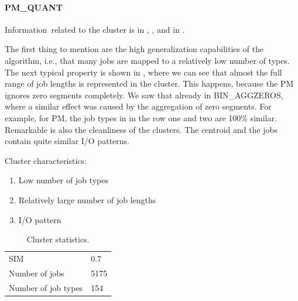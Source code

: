 \documentclass[]{llncs}
\begin{document}
\paragraph{PM\_QUANT}
Information\ related to the cluster is in , , and in .

The first thing to mention are the high generalization capabilities of the algorithm, i.e., that many jobs are mapped to a relatively low number of types.
The next typical property is shown in , where we can see that almost the full range of job lengths is represented in the cluster.
This happens, because the PM ignores zero segments completely.
We saw that already in BIN\_AGGZEROS, where a similar effect was caused by the aggregation of zero segments.
For example, for PM, the job types in  in the row one and two are 100$\%$  similar.
Remarkable is also the cleanliness of the clusters.
The centroid and the jobs contain quite similar I/O patterns.

Cluster characteristics:

\begin{enumerate}
 \item Low number of job types
 \item Relatively large number of job lengths
 \item I/O pattern 
\end{enumerate}

\begin{table}
  \centering
  \begin{tabular}{ll}
    SIM & 0.7 \\
    Number of jobs & 5175 \\
    Number of job types & 154 \\
  \end{tabular}
  \caption{Cluster statistics.}
  \label{fig:pm_quant:stats}
\end{table}
\end{document}
